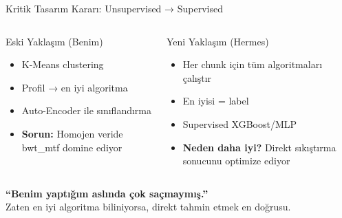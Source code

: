 \documentclass[10pt,aspectratio=43]{beamer}
\begin{document}
\begin{frame}{Kritik Tasarım Kararı: Unsupervised → Supervised}
  \begin{columns}[T]
    \begin{alertblock}{Eski Yaklaşım (Benim)}
      \begin{itemize}
        \setlength{\itemsep}{0.3em}
        \item K-Means clustering
        \item Profil → en iyi algoritma
        \item Auto-Encoder ile sınıflandırma
        \item \textbf{Sorun:} Homojen veride bwt\_mtf domine ediyor
      \end{itemize}
    \end{alertblock}

    \begin{exampleblock}{Yeni Yaklaşım (Hermes)}
      \begin{itemize}
        \setlength{\itemsep}{0.3em}
        \item Her chunk için tüm algoritmaları çalıştır
        \item En iyisi = label
        \item Supervised XGBoost/MLP
        \item \textbf{Neden daha iyi?} Direkt sıkıştırma sonucunu optimize ediyor
      \end{itemize}
    \end{exampleblock}
  \end{columns}

  \vspace{0.5em}
  \begin{center}
    \large\textbf{``Benim yaptığım aslında çok saçmaymış.''} \\[0.3em]
    \small Zaten en iyi algoritma biliniyorsa, direkt tahmin etmek en doğrusu.
  \end{center}
\end{frame}
\end{document}
